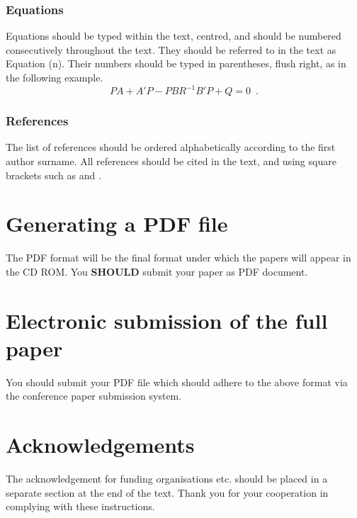 \documentclass{article}\usepackage{graphicx, color}
\begin{document}
\subsubsection{Equations}
Equations should be typed within the text, centred, and
should be numbered consecutively throughout the text.
They should be referred to in the text as Equation (n).
Their numbers should be typed in parentheses, flush right,
as in the following example.
\begin{equation}
	    PA + A'P - PBR^{-1}B'P + Q  =  0 \enspace.
\end{equation}

\subsubsection{References}
The list of references should be ordered alphabetically
according to the first author surname. All references
should be cited in the text, and using square brackets such
as \cite{ref01} and \cite{ref02}.

\section{Generating a {PDF} file}
The PDF format will be the final format under which the
papers will appear in the {CD ROM}. You {\bf SHOULD}
submit your paper as {PDF} document.

\section{Electronic submission of the full paper}
You should submit your {PDF} file which should adhere to
the above format via the conference paper submission
system.

\section*{Acknowledgements}
The acknowledgement for funding organisations etc.
should be placed in a separate section at the end of the
text. Thank you for your cooperation in complying with
these instructions.


\noindent

\end{document}
